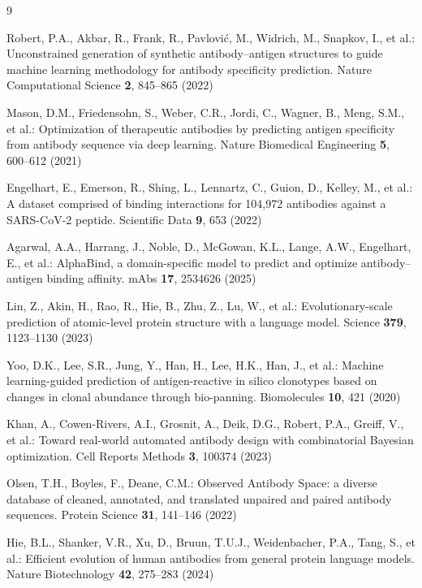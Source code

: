 \documentclass[pdflatex,sn-nature]{sn-jnl}
\theoremstyle{thmstyleone}
\theoremstyle{thmstyletwo}
\theoremstyle{thmstylethree}
\begin{document}
\begin{thebibliography}{9}

Robert, P.A., Akbar, R., Frank, R., Pavlovi\'c, M., Widrich, M., Snapkov, I.,
et al.: Unconstrained generation of synthetic antibody--antigen structures to
guide machine learning methodology for antibody specificity prediction. Nature
Computational Science \textbf{2}, 845--865 (2022)

Mason, D.M., Friedensohn, S., Weber, C.R., Jordi, C., Wagner, B., Meng, S.M.,
et al.: Optimization of therapeutic antibodies by predicting antigen
specificity from antibody sequence via deep learning. Nature Biomedical
Engineering \textbf{5}, 600--612 (2021)

Engelhart, E., Emerson, R., Shing, L., Lennartz, C., Guion, D., Kelley, M.,
et al.: A dataset comprised of binding interactions for 104,972 antibodies
against a SARS-CoV-2 peptide. Scientific Data \textbf{9}, 653 (2022)

Agarwal, A.A., Harrang, J., Noble, D., McGowan, K.L., Lange, A.W., Engelhart,
E., et al.: AlphaBind, a domain-specific model to predict and optimize
antibody--antigen binding affinity. mAbs \textbf{17}, 2534626 (2025)

Lin, Z., Akin, H., Rao, R., Hie, B., Zhu, Z., Lu, W., et al.: Evolutionary-scale
prediction of atomic-level protein structure with a language model. Science
\textbf{379}, 1123--1130 (2023)

Yoo, D.K., Lee, S.R., Jung, Y., Han, H., Lee, H.K., Han, J., et al.: Machine
learning-guided prediction of antigen-reactive in silico clonotypes based on
changes in clonal abundance through bio-panning. Biomolecules \textbf{10}, 421
(2020)

Khan, A., Cowen-Rivers, A.I., Grosnit, A., Deik, D.G., Robert, P.A., Greiff,
V., et al.: Toward real-world automated antibody design with combinatorial
Bayesian optimization. Cell Reports Methods \textbf{3}, 100374 (2023)

Olsen, T.H., Boyles, F., Deane, C.M.: Observed Antibody Space: a diverse
database of cleaned, annotated, and translated unpaired and paired antibody
sequences. Protein Science \textbf{31}, 141--146 (2022)

Hie, B.L., Shanker, V.R., Xu, D., Bruun, T.U.J., Weidenbacher, P.A., Tang, S.,
et al.: Efficient evolution of human antibodies from general protein language
models. Nature Biotechnology \textbf{42}, 275--283 (2024)


\end{thebibliography}
\end{document}
